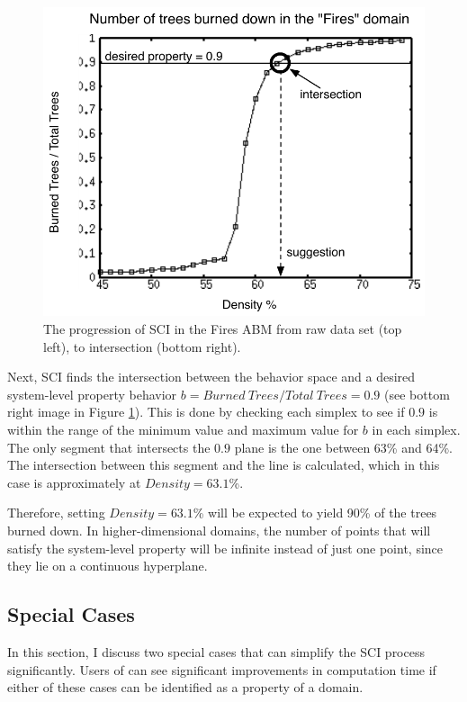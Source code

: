 \begin{figure}[ht]
\includegraphics[scale=.5]{images/rii5.pdf}
\caption{The progression of SCI in the Fires ABM from raw data set (top left), to intersection (bottom right). }
\label{fig:rii}
\end{figure}

Next, SCI finds the intersection between the behavior space and a desired system-level property behavior $b = Burned~{ }Trees / Total~{ }Trees = 0.9$ (see bottom right image in Figure \ref{fig:rii}).
This is done by checking each simplex to see if $0.9$ is within the range of the minimum value and maximum value for $b$ in each simplex.
The only segment that intersects the $0.9$ plane is the one between 63\% and 64\%.
The intersection between this segment and the line is calculated, which in this case is approximately at $Density = 63.1$\%.

Therefore, setting $Density = 63.1$\% will be expected to yield 90\% of the trees burned down.
In higher-dimensional domains, the number of points that will satisfy the system-level property will be infinite instead of just one point, since they lie on a continuous hyperplane.

\subsection{Special Cases}

In this section, I discuss two special cases that can simplify the SCI process significantly.
Users of \fw can see significant improvements in computation time if either of these cases can be identified as a property of a domain.

